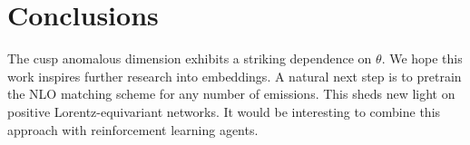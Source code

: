 \section{Conclusions}\label{sec:conclusions}

The cusp anomalous dimension exhibits a striking dependence on $\theta$.
We hope this work inspires further research into embeddings. A natural
next step is to pretrain the NLO matching scheme for any number of
emissions. This sheds new light on positive Lorentz-equivariant
networks. It would be interesting to combine this approach with
reinforcement learning agents.

